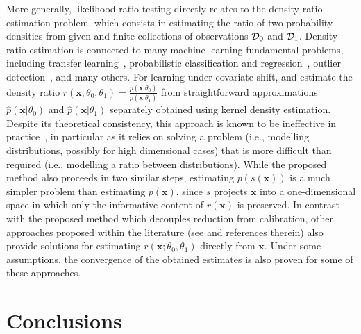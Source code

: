 \documentclass[12pt]{article}
\numberwithin{equation}{section}
\theoremstyle{plain}
\begin{document}
More generally, likelihood ratio testing directly relates to the density ratio
estimation problem, which consists in estimating the ratio of two probability
densities from given and finite collections of observations ${\cal D}_0$ and
${\cal D}_1$. Density ratio estimation is connected to many machine learning
fundamental problems, including transfer learning~\citep{sugiyama2012machine},
probabilistic classification and regression~\citep{vapnik1998statistical},
outlier detection~\citep{hido2011statistical}, and many others. For learning
under covariate shift, \cite{shimodaira2000improving} and \cite{sugiyama2005input} estimate
the density ratio $r(\mathbf{x};\theta_0,\theta_1) =
\frac{p(\mathbf{x}|\theta_0)}{p(\mathbf{x}|\theta_1)}$ from straightforward
approximations $\hat{p}(\mathbf{x}|\theta_0)$ and $\hat{p}(\mathbf{x}|\theta_1)$
separately obtained using kernel density estimation. Despite its theoretical
consistency, this approach is known to be ineffective in
practice~\citep{sugiyama2007covariate,bickel2009discriminative}, in particular
as it relies on solving a problem (i.e., modelling distributions, possibly for high dimensional cases) that is
more difficult than required (i.e., modelling a ratio between distributions).
While the proposed method also proceeds in two similar steps, estimating
$p(s(\mathbf{x}))$ is a much simpler problem than estimating $p(\mathbf{x})$,
since $s$ projects $\mathbf{x}$ into a one-dimensional space in which only
the informative content of $r(\mathbf{x})$ is preserved.
In contrast with the
proposed method which decouples reduction from calibration, other
approaches proposed within the literature (see
\cite{sugiyama2012density,gretton2009covariate,nguyen2010estimating,vapnik2013constructive}
and references therein) also provide solutions for estimating
$r(\mathbf{x};\theta_0,\theta_1)$ directly from $\mathbf{x}$. Under some
assumptions, the convergence of the obtained estimates is also proven for some
of these approaches.



\section{Conclusions}
\label{sec:conclusions}
\end{document}

